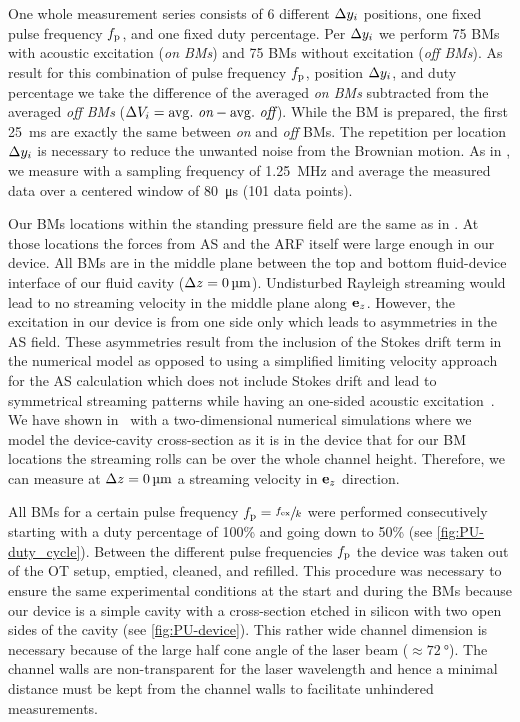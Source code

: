 One whole measurement series consists of 6 different $\Delta y_{i}$ positions, one 
fixed pulse frequency $f_{\mathrm{p}}$, and one fixed duty percentage. Per $\Delta y_{i}$ we 
perform 75 BMs with acoustic excitation (\emph{on BMs}) and 75 BMs without 
excitation (\emph{off BMs}). As result for this combination of pulse frequency 
$f_{\mathrm{p}}$, position $\Delta y_{i}$, and duty percentage we take the difference of the 
averaged \emph{on BMs} subtracted from the averaged \emph{off BMs} ($\Delta V_{i}= 
{\mathrm{avg.~\emph{on}}} - {\mathrm{avg.~\emph{off}}}$). While the BM is 
prepared, the first \SI{25}{\ms} are exactly the same between \emph{on} and 
\emph{off} BMs. The repetition per location $\Delta y_{i}$ is necessary to reduce 
the unwanted noise from the Brownian motion. As in \cite{Goering2021}, we 
measure with a sampling frequency of \SI{1.25}{\mega\hertz} and average the 
measured data over a centered window of \SI{80}{\us} (101 data points).

Our BMs locations within the standing pressure field are the same as in 
\cite{Goering2021}. At those locations the forces from AS and the ARF itself 
were large enough in our device. All BMs are in the middle plane between the 
top and bottom fluid-device interface of our fluid cavity ($\Delta z = 
\SI{0}{\si{\micro\meter}}$). Undisturbed Rayleigh streaming would lead to no streaming 
velocity in the middle plane along $\vb{e}_{z}$. However, the excitation in our device 
is from one side only which leads to asymmetries in the AS field. These 
asymmetries result from the inclusion of the Stokes drift term in the numerical 
model as opposed to using a simplified limiting velocity approach for the AS 
calculation which does not include Stokes drift and lead to symmetrical 
streaming patterns while having an one-sided acoustic 
excitation~\cite{Hahn2016}. We have shown in~\cite{Goering2021} with a 
two-dimensional numerical simulations where we model the device-cavity 
cross-section as it is in the device that for our BM locations the streaming 
rolls can be over the whole channel height. Therefore, we can measure at $\Delta z 
= \SI{0}{\si{\micro\meter}}$ a streaming velocity in $\vb{e}_{z}$ direction.

All BMs for a certain pulse frequency $f_{\mathrm{p}}=\sfrac{f_{\mathrm{ex}}}{k}$ were performed 
consecutively starting with a duty percentage of 100\% and going down to 50\% 
(see \cref{fig:PU-duty_cycle}). Between the different pulse frequencies $f_{\mathrm{p}}$ the 
device was taken out of the OT setup, emptied, cleaned, and refilled. This 
procedure was necessary to ensure the same experimental conditions at the start 
and during the BMs because our device is a simple cavity with a 
 cross-section etched 
in silicon with two open sides of the cavity (see \cref{fig:PU-device}). This 
rather wide channel dimension is necessary because of the large half cone angle 
of the laser beam ($\approx \SI{72}{\degree}$). The channel walls are 
non-transparent for the laser wavelength and hence a minimal distance must be 
kept from the channel walls to facilitate unhindered measurements.

